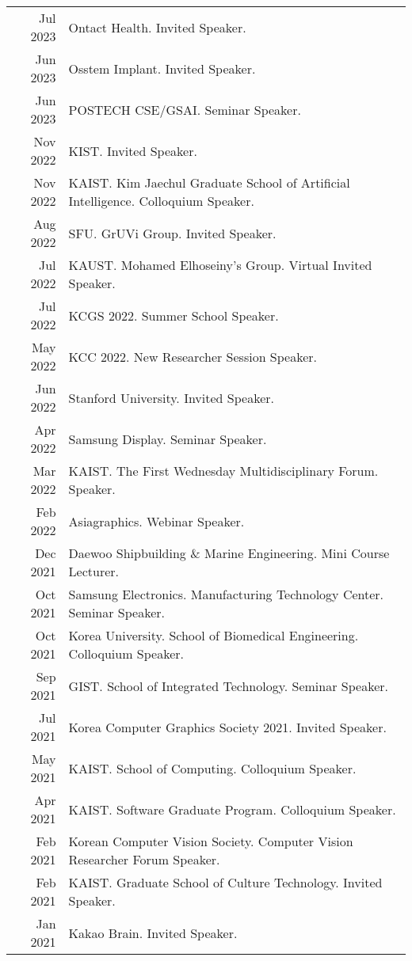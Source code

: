 \documentclass[letterpaper,10pt]{article} %
\newcommand{\blankline}{\quad\pagebreak[2]}
\begin{document}
{{\begin{tabular}{r|p{11cm}}
Jul 2023 & Ontact Health. Invited Speaker.\\
Jun 2023 & Osstem Implant. Invited Speaker.\\
Jun 2023 & POSTECH CSE/GSAI. Seminar Speaker.\\
Nov 2022 & KIST. Invited Speaker.\\
Nov 2022 & KAIST. Kim Jaechul Graduate School of Artificial Intelligence. Colloquium Speaker.\\
Aug 2022 & SFU. GrUVi Group. Invited Speaker.\\
Jul 2022 & KAUST. Mohamed Elhoseiny's Group. Virtual Invited Speaker.\\
Jul 2022 & KCGS 2022. Summer School Speaker. \\
May 2022 & KCC 2022. New Researcher Session Speaker.\\
Jun 2022 & Stanford University. Invited Speaker.\\
Apr 2022 & Samsung Display. Seminar Speaker.\\
Mar 2022 & KAIST. The First Wednesday Multidisciplinary Forum. Speaker.\\
Feb 2022 & Asiagraphics. Webinar Speaker.\\
Dec 2021 & Daewoo Shipbuilding \& Marine Engineering. Mini Course Lecturer.\\
Oct 2021 & Samsung Electronics. Manufacturing Technology Center. Seminar Speaker.\\
Oct 2021 & Korea University. School of Biomedical Engineering. Colloquium Speaker.\\
Sep 2021 & GIST. School of Integrated Technology. Seminar Speaker.\\
Jul 2021 & Korea Computer Graphics Society 2021. Invited Speaker.\\
May 2021 & KAIST. School of Computing. Colloquium Speaker.\\
Apr 2021 & KAIST. Software Graduate Program. Colloquium Speaker.\\
Feb 2021 & Korean Computer Vision Society. Computer Vision Researcher Forum Speaker.\\
Feb 2021 & KAIST. Graduate School of Culture Technology. Invited Speaker.\\
Jan 2021 & Kakao Brain. Invited Speaker.\\
\end{tabular}\\

\blankline



}}
\end{document}
